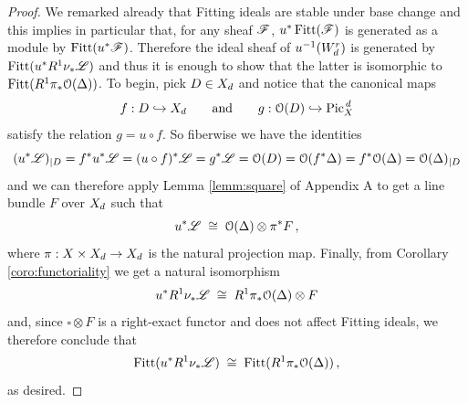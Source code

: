 	\begin{proof}
		We remarked already that Fitting ideals are stable under base change and this implies in particular that, for any sheaf $\mathscr{F}$, $u^*\operatorname{Fitt}(\mathscr{F})$ is generated as a module by $\operatorname{Fitt}(u^*\mathscr{F})$. Therefore the ideal sheaf of $u^{-1}(W_d^r)$ is generated by $\operatorname{Fitt}(u^* R^1\nu_{*}\mathscr{L})$ and thus it is enough to show that the latter is isomorphic to $\operatorname{Fitt}(R^1\pi_* \mathcal{O}(\Delta))$. To begin, pick $D\in X_d$ and notice that the canonical maps
		$$ f: D \hookrightarrow X_d \qquad \text{and} \qquad g: \mathcal{O}(D)\hookrightarrow \operatorname{Pic}^{\,d}_X $$
		satisfy the relation $g = u\circ f$. So fiberwise we have the identities
		$$ (u^* \mathscr{L})_{\mid D} = f^* u^* \mathscr{L} = (u\circ f)^* \mathscr{L} = g^* \mathscr{L} = \mathcal{O}(D) = \mathcal{O}(f^* \Delta) = f^*\mathcal{O}(\Delta) = \mathcal{O}(\Delta)_{\mid D} $$
		and we can therefore apply Lemma \ref{lemm:square} of Appendix A to get a line bundle $F$ over $X_d$ such that
		$$ u^* \mathscr{L} \;\cong\; \mathcal{O}(\Delta) \otimes \pi^* F \,, $$
		where $\pi: X\times X_d \to X_d$ is the natural projection map. Finally, from Corollary \ref{coro:functoriality} we get a natural isomorphism
		$$ u^*  R^1\nu_{*}\mathscr{L} \;\cong\; R^1\pi_*\mathcal{O}(\Delta)\otimes F $$
		and, since $\square\otimes F$ is a right-exact functor and does not affect Fitting ideals, we therefore conclude that
		$$ \operatorname{Fitt}(u^* R^1\nu_{*}\mathscr{L}) 
		\;\cong\; 
		\operatorname{Fitt}(R^1\pi_*\mathcal{O}(\Delta))\,, $$
		as desired.
	\end{proof}


